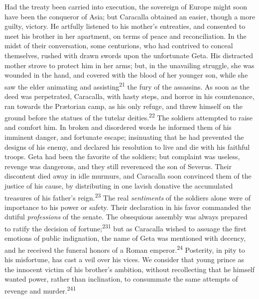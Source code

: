 Had the treaty been carried into execution, the sovereign of
Europe might soon have been the conqueror of Asia; but Caracalla
obtained an easier, though a more guilty, victory. He artfully
listened to his mother’s entreaties, and consented to meet his
brother in her apartment, on terms of peace and reconciliation.
In the midst of their conversation, some centurions, who had
contrived to conceal themselves, rushed with drawn swords upon
the unfortunate Geta. His distracted mother strove to protect him
in her arms; but, in the unavailing struggle, she was wounded in
the hand, and covered with the blood of her younger son, while
she saw the elder animating and assisting\textsuperscript{21} the fury of the
assassins. As soon as the deed was perpetrated, Caracalla, with
hasty steps, and horror in his countenance, ran towards the
Prætorian camp, as his only refuge, and threw himself on the
ground before the statues of the tutelar deities.\textsuperscript{22} The soldiers
attempted to raise and comfort him. In broken and disordered
words he informed them of his imminent danger, and fortunate
escape; insinuating that he had prevented the designs of his
enemy, and declared his resolution to live and die with his
faithful troops. Geta had been the favorite of the soldiers; but
complaint was useless, revenge was dangerous, and they still
reverenced the son of Severus. Their discontent died away in idle
murmurs, and Caracalla soon convinced them of the justice of his
cause, by distributing in one lavish donative the accumulated
treasures of his father’s reign.\textsuperscript{23} The real \textit{sentiments} of the
soldiers alone were of importance to his power or safety. Their
declaration in his favor commanded the dutiful \textit{professions} of
the senate. The obsequious assembly was always prepared to ratify
the decision of fortune;\textsuperscript{231} but as Caracalla wished to assuage
the first emotions of public indignation, the name of Geta was
mentioned with decency, and he received the funeral honors of a
Roman emperor.\textsuperscript{24} Posterity, in pity to his misfortune, has cast
a veil over his vices. We consider that young prince as the
innocent victim of his brother’s ambition, without recollecting
that he himself wanted power, rather than inclination, to
consummate the same attempts of revenge and murder.\textsuperscript{241}


